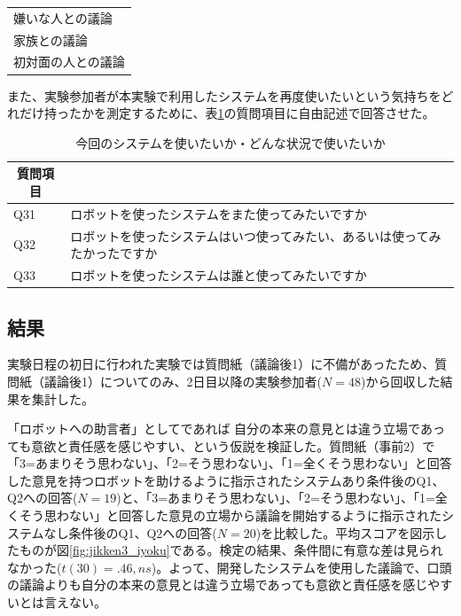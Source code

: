 \documentclass[11pt, a4paper]{jreport} %
\begin{document}
\begin{table}[]
\begin{tabular}{@{}l@{}}
	\hspace{0.5cm}嫌いな人との議論                                                                                 \\
	\hspace{0.5cm}家族との議論                                                                                   \\
	\hspace{0.5cm}初対面の人との議論                                                                                \\ \bottomrule
\end{tabular}
\end{table}




また、実験参加者が本実験で利用したシステムを再度使いたいという気持ちをどれだけ持ったかを測定するために、表\ref{tab:intention}の質問項目に自由記述で回答させた。
\begin{table}[H]
\caption{今回のシステムを使いたいか・どんな状況で使いたいか}
\centering
\label{tab:intention}
\begin{tabular}{@{}ll@{}}
\toprule
\multicolumn{1}{c}{質問項目}              \\ \midrule
Q31&ロボットを使ったシステムをまた使ってみたいですか\\
Q32&ロボットを使ったシステムはいつ使ってみたい、あるいは使ってみたかったですか\\
Q33&ロボットを使ったシステムは誰と使ってみたいですか \\ \bottomrule
\end{tabular}
\end{table}

\subsection{結果}
実験日程の初日に行われた実験では質問紙（議論後1）に不備があったため、質問紙（議論後1）についてのみ、2日目以降の実験参加者($N=48$)から回収した結果を集計した。


「ロボットへの助言者」としてであれば
自分の本来の意見とは違う立場であっても意欲と責任感を感じやすい、という仮説を検証した。質問紙（事前2）で「3=あまりそう思わない」、「2=そう思わない」、「1=全くそう思わない」と回答した意見を持つロボットを助けるように指示されたシステムあり条件後のQ1、Q2への回答($N=19$)と、「3=あまりそう思わない」、「2=そう思わない」、「1=全くそう思わない」と回答した意見の立場から議論を開始するように指示されたシステムなし条件後のQ1、Q2への回答($N=20$)を比較した。平均スコアを図示したものが図\ref{fig:jikken3_iyoku}である。検定の結果、条件間に有意な差は見られなかった($t(30)= .46, ns$)。よって、開発したシステムを使用した議論で、口頭の議論よりも自分の本来の意見とは違う立場であっても意欲と責任感を感じやすいとは言えない。
\end{document}
